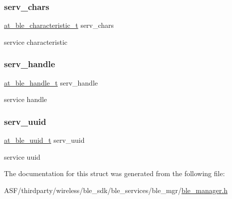 \subsubsection{\texorpdfstring{serv\_chars}{serv\_chars}}
{\footnotesize\ttfamily \mbox{\hyperlink{structat__ble__characteristic__t}{at\+\_\+ble\+\_\+characteristic\+\_\+t}} serv\+\_\+chars}



service characteristic 

\mbox{\label{structgatt__service__handler_aca01574e34f7351ca2e1fabdfa5b688a}} 
\subsubsection{\texorpdfstring{serv\_handle}{serv\_handle}}
{\footnotesize\ttfamily \mbox{\hyperlink{at__ble__api_8h_abd23646d0c662860741f787efc8456f2}{at\+\_\+ble\+\_\+handle\+\_\+t}} serv\+\_\+handle}



service handle 

\mbox{\label{structgatt__service__handler_a4224f62d8329c28f97ce9e3a9e8782e8}} 
\subsubsection{\texorpdfstring{serv\_uuid}{serv\_uuid}}
{\footnotesize\ttfamily \mbox{\hyperlink{structat__ble__uuid__t}{at\+\_\+ble\+\_\+uuid\+\_\+t}} serv\+\_\+uuid}



service uuid 



The documentation for this struct was generated from the following file\+:\begin{DoxyCompactItemize}
\item 
A\+S\+F/thirdparty/wireless/ble\+\_\+sdk/ble\+\_\+services/ble\+\_\+mgr/\mbox{\hyperlink{ble__manager_8h}{ble\+\_\+manager.\+h}}\end{DoxyCompactItemize}
